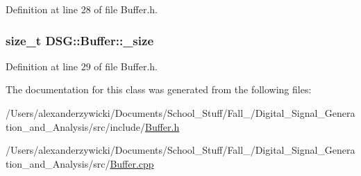 Definition at line 28 of file Buffer.\+h.

\hypertarget{classDSG_1_1Buffer_a4e2fef9ed617af2554b25c999def8f71}{
\subsubsection[{\+\_\+size}]{\setlength{\rightskip}{0pt plus 5cm}size\+\_\+t D\+S\+G\+::\+Buffer\+::\+\_\+size\hspace{0.3cm}{\ttfamily [protected]}}}\label{classDSG_1_1Buffer_a4e2fef9ed617af2554b25c999def8f71}


Definition at line 29 of file Buffer.\+h.



The documentation for this class was generated from the following files\+:\begin{DoxyCompactItemize}
\item 
/\+Users/alexanderzywicki/\+Documents/\+School\+\_\+\+Stuff/\+Fall\+\_/\+Digital\+\_\+\+Signal\+\_\+\+Generation\+\_\+and\+\_\+\+Analysis/src/include/\hyperlink{Buffer_8h}{Buffer.\+h}\item 
/\+Users/alexanderzywicki/\+Documents/\+School\+\_\+\+Stuff/\+Fall\+\_/\+Digital\+\_\+\+Signal\+\_\+\+Generation\+\_\+and\+\_\+\+Analysis/src/\hyperlink{Buffer_8cpp}{Buffer.\+cpp}\end{DoxyCompactItemize}
